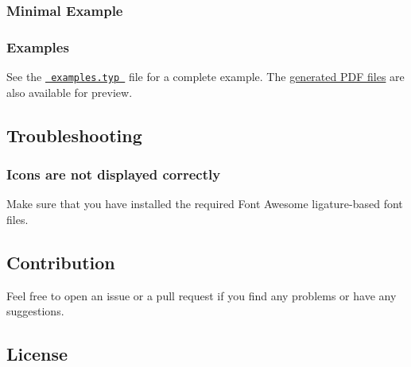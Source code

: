 \subsubsection{Minimal Example}\label{minimal-example}

\begin{Shaded}
\begin{Highlighting}[]

\end{Highlighting}
\end{Shaded}

\subsubsection{Examples}\label{examples}

See the
\href{https://github.com/typst/packages/raw/main/packages/preview/iconic-salmon-fa/1.0.0/examples/examples.typ}{\texttt{\ examples.typ\ }}
file for a complete example. The
\href{https://github.com/typst/packages/raw/main/packages/preview/iconic-salmon-fa/1.0.0/examples/}{generated
PDF files} are also available for preview.

\subsection{Troubleshooting}\label{troubleshooting}

\subsubsection{Icons are not displayed
correctly}\label{icons-are-not-displayed-correctly}

Make sure that you have installed the required Font Awesome
ligature-based font files.

\subsection{Contribution}\label{contribution}

Feel free to open an issue or a pull request if you find any problems or
have any suggestions.

\subsection{License}\label{license}

